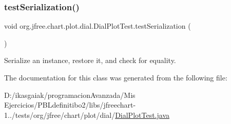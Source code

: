 \subsubsection{\texorpdfstring{test\+Serialization()}{testSerialization()}}
{\footnotesize\ttfamily void org.\+jfree.\+chart.\+plot.\+dial.\+Dial\+Plot\+Test.\+test\+Serialization (\begin{DoxyParamCaption}{ }\end{DoxyParamCaption})}

Serialize an instance, restore it, and check for equality. 

The documentation for this class was generated from the following file\+:\begin{DoxyCompactItemize}
\item 
D\+:/ikasgaiak/programacion\+Avanzada/\+Mis Ejercicios/\+P\+B\+Ldefinitibo2/libs/jfreechart-\/1../tests/org/jfree/chart/plot/dial/\mbox{\hyperlink{_dial_plot_test_8java}{Dial\+Plot\+Test.\+java}}\end{DoxyCompactItemize}
